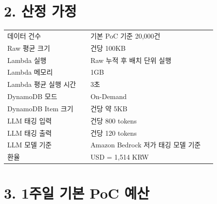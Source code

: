 \documentclass[12pt,a4paper]{article}
\newcommand{\DocNeedspace}[1]{\par\ifdim\dimexpr\pagegoal-\pagetotal\relax<#1\newpage\fi}
\begin{document}
\DocNeedspace{10\baselineskip}
\section*{2. 산정 가정}


\DocNeedspace{28\baselineskip}
\begin{small}
\begin{longtable}{@{}>{\RaggedRight\arraybackslash}m{0.370\linewidth}>{\RaggedRight\arraybackslash}m{0.570\linewidth}@{}}
\toprule
\multicolumn{1}{>{\centering\arraybackslash}m{0.370\linewidth}}{\textbf{항목}} & \multicolumn{1}{>{\centering\arraybackslash}m{0.570\linewidth}}{\textbf{가정}} \\
\midrule
\endhead
데이터 건수 & 기본 PoC 기준 20,000건 \\
Raw 평균 크기 & 건당 100KB \\
Lambda 실행 & Raw 누적 후 배치 단위 실행 \\
Lambda 메모리 & 1GB \\
Lambda 평균 실행 시간 & 3초 \\
DynamoDB 모드 & {\footnotesize On-\allowbreak{}Demand} \\
DynamoDB Item 크기 & 건당 약 5KB \\
LLM 태깅 입력 & 건당 800 tokens \\
LLM 태깅 출력 & 건당 120 tokens \\
LLM 모델 기준 & Amazon Bedrock 저가 태깅 모델 기준 \\
환율 & 1 USD = 1,514 KRW \\
\bottomrule
\end{longtable}
\end{small}


\newpage

\DocNeedspace{10\baselineskip}
\section*{3. 1주일 기본 PoC 예산}
\end{document}

